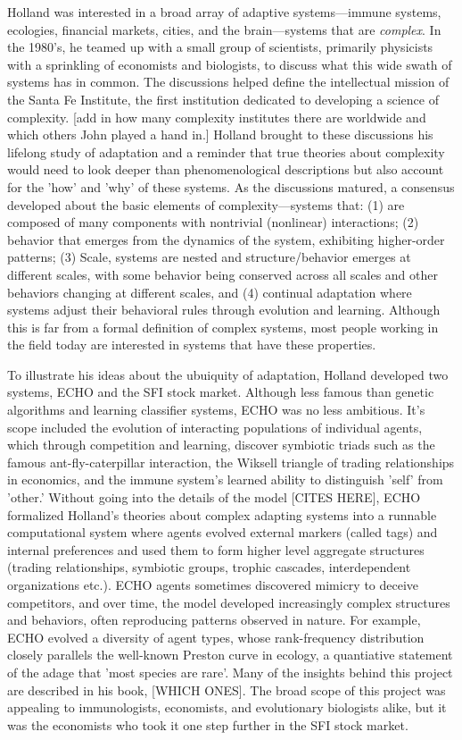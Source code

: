 \documentclass{sig-alternate}
\begin{document}
Holland was interested in a broad array of adaptive systems---immune systems, ecologies, financial markets, cities, and the brain---systems that are \emph{complex}.  In the 1980's, he teamed up with a small group of scientists, primarily physicists with a sprinkling of economists and biologists, to discuss what this wide swath of systems has in common.  The discussions helped define the intellectual mission of the Santa Fe Institute, the first institution dedicated to developing a science of complexity.  [add in how many complexity institutes there are worldwide and which others John played a hand in.]  Holland brought to these discussions his lifelong study of adaptation and a reminder that true theories about complexity would need to look deeper than phenomenological descriptions but also account for the  'how' and 'why' of these systems.
As the discussions matured, a consensus developed about the basic elements of complexity---systems that: (1)  are composed of many components with nontrivial (nonlinear) interactions; (2) behavior that emerges from the dynamics of the system, exhibiting higher-order patterns; (3) Scale, systems are nested and structure/behavior emerges at different scales, with some behavior being conserved across all scales and other behaviors changing at different scales, and (4) continual adaptation where systems adjust their behavioral rules through evolution and learning.  Although this is far from a formal definition of complex systems, most people working in the field today are interested in systems that have these properties.

To illustrate his ideas about the ubuiquity of adaptation, Holland developed two systems, ECHO and the SFI stock market.
Although less famous than genetic algorithms and learning classifier systems, ECHO was no less ambitious.  It's scope included the evolution of interacting populations of individual agents, which through competition and learning, discover symbiotic triads such as the famous ant-fly-caterpillar interaction,  the Wiksell triangle of trading relationships in economics, and the immune system's learned ability to distinguish 'self' from 'other.'  Without going into the details of the model [CITES HERE], ECHO formalized Holland's theories about complex adapting systems into a runnable computational system where agents evolved external markers (called tags) and internal preferences and used them to form higher level aggregate structures (trading relationships, symbiotic groups, trophic cascades, interdependent organizations etc.).  ECHO agents sometimes discovered mimicry to deceive competitors, and over time, the model developed increasingly complex structures and behaviors, often reproducing patterns observed in nature.  For example,  ECHO evolved a diversity of agent types, whose rank-frequency distribution closely parallels the well-known Preston curve in ecology, a quantiative statement of the adage that 'most species are rare'. Many of the insights behind this project are described in his book, [WHICH ONES]. The broad scope of this project was appealing to immunologists, economists, and evolutionary biologists alike, but it was the economists who took it one step further in the SFI stock market.
\end{document}

